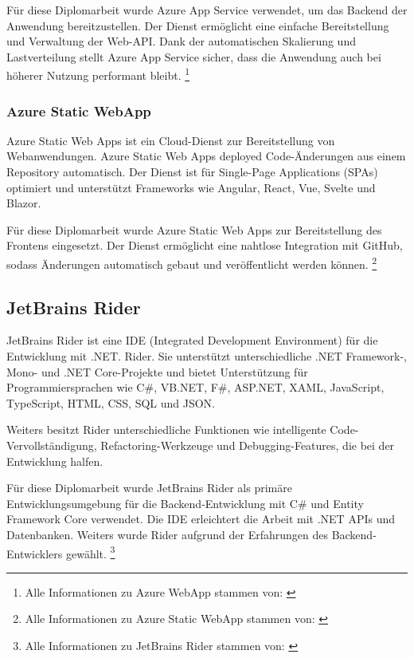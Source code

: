 Für diese Diplomarbeit wurde Azure App Service verwendet, um das Backend der 
Anwendung bereitzustellen. Der Dienst ermöglicht eine einfache Bereitstellung 
und Verwaltung der Web-API. Dank der automatischen Skalierung und Lastverteilung 
stellt Azure App Service sicher, dass die Anwendung auch bei höherer Nutzung 
performant bleibt.
\footnote{Alle Informationen zu Azure WebApp stammen von: \cite{MicrosoftCorporationy}}

\subsubsection{Azure Static WebApp}
\label{subsection:azure_static_web_app}

Azure Static Web Apps ist ein Cloud-Dienst zur Bereitstellung von Webanwendungen. 
Azure Static Web Apps deployed Code-Änderungen aus einem Repository automatisch. Der Dienst 
ist für Single-Page Applications (SPAs) optimiert und unterstützt Frameworks wie Angular, 
React, Vue, Svelte und Blazor.

Für diese Diplomarbeit wurde Azure Static Web Apps zur Bereitstellung des Frontens 
eingesetzt. Der Dienst ermöglicht eine nahtlose Integration mit GitHub, sodass Änderungen 
automatisch gebaut und veröffentlicht werden können.
\footnote{Alle Informationen zu Azure Static WebApp stammen von: \cite{MicrosoftCorporationz}}

\subsection{JetBrains Rider}
\label{subsection:jetbrains-rider}

JetBrains Rider ist eine IDE (Integrated Development Environment) für die Entwicklung mit .NET. 
Rider. Sie unterstützt unterschiedliche .NET Framework-, Mono- und .NET Core-Projekte und bietet 
Unterstützung für Programmiersprachen wie C\#, VB.NET, F\#, ASP.NET, XAML, JavaScript, 
TypeScript, HTML, CSS, SQL und JSON.

Weiters besitzt Rider unterschiedliche Funktionen wie intelligente Code-Vervollständigung, 
Refactoring-Werkzeuge und Debugging-Features, die bei der Entwicklung halfen. 

Für diese Diplomarbeit wurde JetBrains Rider als primäre Entwicklungsumgebung für die 
Backend-Entwicklung mit C\# und Entity Framework Core verwendet. Die IDE erleichtert 
die Arbeit mit .NET APIs und Datenbanken. Weiters wurde Rider aufgrund der 
Erfahrungen des Backend-Entwicklers gewählt.
\footnote{Alle Informationen zu JetBrains Rider stammen von: \cite{JetBrains}}

